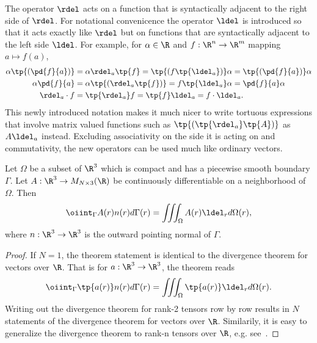 \begin{rk}
The operator $\rdel$ acts on a function that is syntactically adjacent to the right side of $\rdel$. 
For notational convenicence the operator $\ldel$ is introduced so that it acts exactly like $\rdel$ but
on functions that are syntactically adjacent to the left side $\ldel$.  For example, for $\alpha\in \R$
and $f:\R^n\to \R^m$ mapping $a\mapsto f(a)$,
\begin{align}
    \alpha \tp{\left(\pd{f}{a}\right)} &= \alpha \rdel_a \tp{f} = \tp{(f \tp{\ldel_a})} \alpha = \tp{\left(\pd{f}{a}\right)} \alpha \\
    \alpha \pd{f}{a} &= \alpha \tp{(\rdel_a \tp{f})} = f \tp{\ldel_a} \alpha = \pd{f}{a} \alpha \\
    \rdel_a \cdot f &= \tp{\rdel_a} f = \tp{f} \ldel_a = f \cdot \ldel_a.
\end{align}
This newly introduced notation makes it much nicer to write tortuous expressions that involve matrix
valued functions such as $\tp{(\tp{\rdel_a} \tp{A})}$ as $A \ldel_a$ instead.
Excluding associativity on the side it is acting on and commutativity,
the new operators can be used much like ordinary vectors.
\end{rk}

\begin{thm}
    Let $\Omega$ be a subset of $\R^3$ which is compact and has
    a piecewise smooth boundary $\Gamma$.
    Let $A:\R^3 \to M_{N\times 3}(\R)$ be continuously differentiable
    on a neighborhood of $\Omega$.  Then
    \begin{equation}
        \oiint_\Gamma A(r) n(r) d\Gamma(r)
        = \iiint_\Omega A(r) \ldel_r d\Omega(r),
    \end{equation}
    where $n:\R^3\to \R^3$ is the outward pointing normal of $\Gamma$.
\end{thm}
\begin{proof}
    If $N=1$, the theorem statement is identical to the divergence theorem for vectors over $\R$.
    That is for $a:\R^3 \to \R^3$, the theorem reads
    \begin{equation}
        \oiint_\Gamma \tp{a(r)} n(r) d\Gamma(r)
        = \iiint_\Omega  \tp{a(r)} \ldel_r d\Omega(r).
    \end{equation}
    Writing out the divergence theorem for rank-2 tensors row by row results in $N$
    statements of the divergence theorem for vectors over $\R$.
    Similarily,  it is easy to generalize the divergence theorem to rank-n tensors over $\R$,
    e.g. see~\cite{riley}.
\end{proof}

